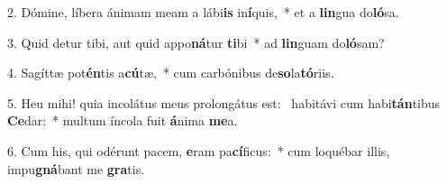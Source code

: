 2. Dómine, líbera ánimam meam a lábi\textbf{is} in\textbf{í}quis,~*  et a \textbf{lin}gua do\textbf{ló}sa.\

3. Quid detur tibi, aut quid appo\textbf{ná}tur \textbf{ti}bi~*  ad \textbf{lin}guam do\textbf{ló}sam?\

4. Sagíttæ pot\textbf{én}tis a\textbf{cú}tæ,~*  cum carbónibus de\textbf{so}la\textbf{tó}riis.\

5. Heu mihi! quia incolátus meus prolongátus est: \dag\  habitávi cum habi\textbf{tán}tibus \textbf{Ce}dar:~*  multum íncola fuit \textbf{á}nima \textbf{me}a.\

6. Cum his, qui odérunt pacem, \textbf{e}ram pa\textbf{cí}ficus:~*  cum loquébar illis, impu\textbf{gná}bant me \textbf{gra}tis.\

